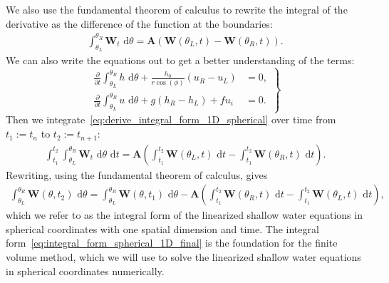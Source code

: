 We also use the fundamental theorem of calculus to rewrite the integral of the derivative as the difference of the function at the boundaries:
\begin{align}\label{eq:derive_integral_form_1D_spherical}
    \int_{\theta_L}^{\theta_R} \mathbf{W}_t \text{ d}\theta =  \mathbf{A} \left( \mathbf{W}(\theta_L, t) - \mathbf{W}(\theta_R, t) \right).
\end{align}
We can also write the equations out to get a better understanding of the terms:
\begin{equation}\label{eq:integral_form_spherical_1D}
    \left.
    \begin{aligned}
        \frac{\partial}{\partial t} \int_{\theta_L}^{\theta_R} h \text{ d}\theta + \frac{h_0}{r \cos(\phi)} (u_R - u_L) &= 0, \\
        \frac{\partial}{\partial t} \int_{\theta_L}^{\theta_R} u \text{ d}\theta + g(h_R - h_L) + fu_i &= 0.
    \end{aligned}
    \right\}
\end{equation}
Then we integrate~\eqref{eq:derive_integral_form_1D_spherical} over time from $t_1 := t_n$ to $t_2 := t_{n+1}$:
\begin{align*}
    \int_{t_1}^{t_2} \int_{\theta_L}^{\theta_R} \mathbf{W}_t \text{ d}\theta \text{ d}t = \mathbf{A} \left( \int_{t_1}^{t_2} \mathbf{W}(\theta_L, t) \text{ d}t - \int_{t_1}^{t_2} \mathbf{W}(\theta_R, t) \text{ d}t \right).
\end{align*}
Rewriting, using the fundamental theorem of calculus, gives
\begin{align}\label{eq:integral_form_spherical_1D_final}
    \int_{\theta_L}^{\theta_R} \mathbf{W}(\theta, t_2) \text{ d}\theta = \int_{\theta_L}^{\theta_R} \mathbf{W}(\theta, t_1) \text{ d}\theta
    - \mathbf{A} \left( \int_{t_1}^{t_2} \mathbf{W}(\theta_R, t) \text{ d}t - \int_{t_1}^{t_2} \mathbf{W}(\theta_L, t) \text{ d}t \right),
\end{align}
which we refer to as the integral form of the linearized shallow water equations in spherical coordinates with one spatial dimension and time.
The integral form~\eqref{eq:integral_form_spherical_1D_final} is the foundation for the finite volume method, which we will use to solve the linearized shallow water equations in spherical coordinates numerically.



